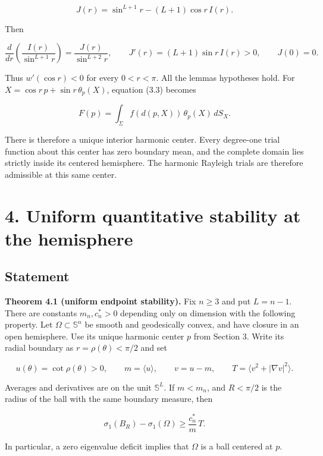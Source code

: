 \documentclass[11pt]{article}
\begin{document}
\[
J(r)=\sin^{L+1}r-(L+1)\cos r\,I(r).
\tag{3.18}
\]

Then

\[
\frac{d}{dr}\left(\frac{I(r)}{\sin^{L+1}r}\right)
=\frac{J(r)}{\sin^{L+2}r},\qquad
J'(r)=(L+1)\sin r\,I(r)>0,\qquad J(0)=0.
\tag{3.19}
\]

Thus \(w'(\cos r)<0\) for every \(0<r<\pi\). All the
lemma\textquotesingle s hypotheses hold. For
\(X=\cos r\,p+\sin r\,\theta_p(X)\), equation (3.3) becomes

\[
F(p)=\int_\Sigma f(d(p,X))\,\theta_p(X)\,dS_X.
\tag{3.20}
\]

There is therefore a unique interior harmonic center. Every degree-one
trial function about this center has zero boundary mean, and the
complete domain lies strictly inside its centered hemisphere. The
harmonic Rayleigh trials are therefore admissible at this same center.

\section{4. Uniform quantitative stability at the
hemisphere}\label{uniform-quantitative-stability-at-the-hemisphere}

\subsection{Statement}\label{statement}

\textbf{Theorem 4.1 (uniform endpoint stability).} Fix \(n\geq3\) and
put \(L=n-1\). There are constants \(m_n,c_n^*>0\) depending only on
dimension with the following property. Let \(\Omega\subset\mathbb S^n\)
be smooth and geodesically convex, and have closure in an open
hemisphere. Use its unique harmonic center \(p\) from Section 3. Write
its radial boundary as \(r=\rho(\theta)<\pi/2\) and set

\[
u(\theta)=\cot\rho(\theta)>0,\qquad
m=\langle u\rangle,\qquad
v=u-m,\qquad
T=\langle v^2+|\nabla v|^2\rangle.
\tag{4.1}
\]

Averages and derivatives are on the unit \(\mathbb S^L\). If \(m<m_n\),
and \(R<\pi/2\) is the radius of the ball with the same boundary
measure, then

\[
\sigma_1(B_R)-\sigma_1(\Omega)
\geq \frac{c_n^*}{m}\,T.
\tag{4.2}
\]

In particular, a zero eigenvalue deficit implies that \(\Omega\) is a
ball centered at \(p\).
\end{document}
